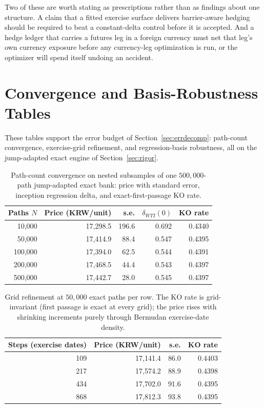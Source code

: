 \documentclass[11pt,a4paper]{article}
\begin{document}
Two of these are worth stating as prescriptions rather than as findings about one structure. A claim that a fitted exercise surface delivers barrier-aware hedging should be required to beat a constant-delta control before it is accepted. And a hedge ledger that carries a futures leg in a foreign currency must net that leg's own currency exposure before any currency-leg optimization is run, or the optimizer will spend itself undoing an accident.

\appendix
\section{Convergence and Basis-Robustness Tables}
\label{sec:convtables}

These tables support the error budget of Section~\ref{sec:errdecomp}: path-count convergence, exercise-grid refinement, and regression-basis robustness, all on the jump-adapted exact engine of Section~\ref{sec:rigor}.

\begin{table}[h]
\centering
\small
\begin{tabular}{rrrrr}
\toprule
Paths $N$ & Price (KRW/unit) & s.e. & $\delta_{WTI}(0)$ & KO rate \\
\midrule
10{,}000 & 17{,}298.5 & 196.6 & 0.692 & 0.4340 \\
50{,}000 & 17{,}414.9 & 88.4 & 0.547 & 0.4395 \\
100{,}000 & 17{,}394.0 & 62.5 & 0.544 & 0.4391 \\
200{,}000 & 17{,}468.5 & 44.4 & 0.543 & 0.4397 \\
500{,}000 & 17{,}442.7 & 28.0 & 0.545 & 0.4397 \\
\bottomrule
\end{tabular}
\caption{Path-count convergence on nested subsamples of one $500{,}000$-path jump-adapted exact bank: price with standard error, inception regression delta, and exact-first-passage KO rate.}
\label{tab:convpaths}
\end{table}

\begin{table}[h]
\centering
\small
\begin{tabular}{rrrr}
\toprule
Steps (exercise dates) & Price (KRW/unit) & s.e. & KO rate \\
\midrule
109 & 17{,}141.4 & 86.0 & 0.4403 \\
217 & 17{,}574.2 & 88.9 & 0.4398 \\
434 & 17{,}702.0 & 91.6 & 0.4395 \\
868 & 17{,}812.3 & 93.8 & 0.4395 \\
\bottomrule
\end{tabular}
\caption{Grid refinement at $50{,}000$ exact paths per row. The KO rate is grid-invariant (first passage is exact at every grid); the price rises with shrinking increments purely through Bermudan exercise-date density.}
\label{tab:convsteps}
\end{table}
\end{document}
